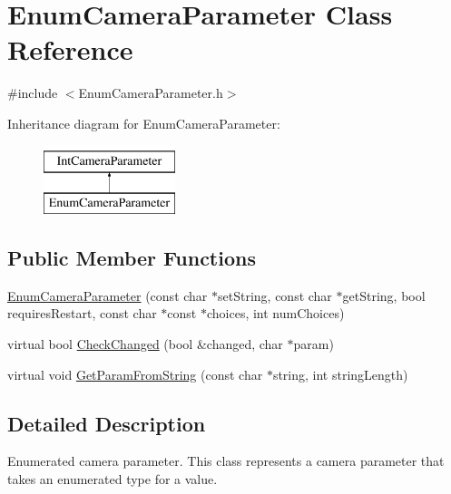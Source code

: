 \hypertarget{classEnumCameraParameter}{
\section{EnumCameraParameter Class Reference}
\label{classEnumCameraParameter}
}


{\ttfamily \#include $<$EnumCameraParameter.h$>$}

Inheritance diagram for EnumCameraParameter:\begin{figure}[H]
\begin{center}
\leavevmode
\includegraphics[height=2.000000cm]{classEnumCameraParameter}
\end{center}
\end{figure}
\subsection*{Public Member Functions}
\begin{DoxyCompactItemize}
\item 
\hyperlink{classEnumCameraParameter_ae53765dea6e8418732b3b0d855c741d4}{EnumCameraParameter} (const char $\ast$setString, const char $\ast$getString, bool requiresRestart, const char $\ast$const $\ast$choices, int numChoices)
\item 
virtual bool \hyperlink{classEnumCameraParameter_a56ccba7b3ce50b5ea37601d661ae69fb}{CheckChanged} (bool \&changed, char $\ast$param)
\item 
virtual void \hyperlink{classEnumCameraParameter_ac7ffca634a3cd7091cebc2384bdc6873}{GetParamFromString} (const char $\ast$string, int stringLength)
\end{DoxyCompactItemize}


\subsection{Detailed Description}
Enumerated camera parameter. This class represents a camera parameter that takes an enumerated type for a value. 

